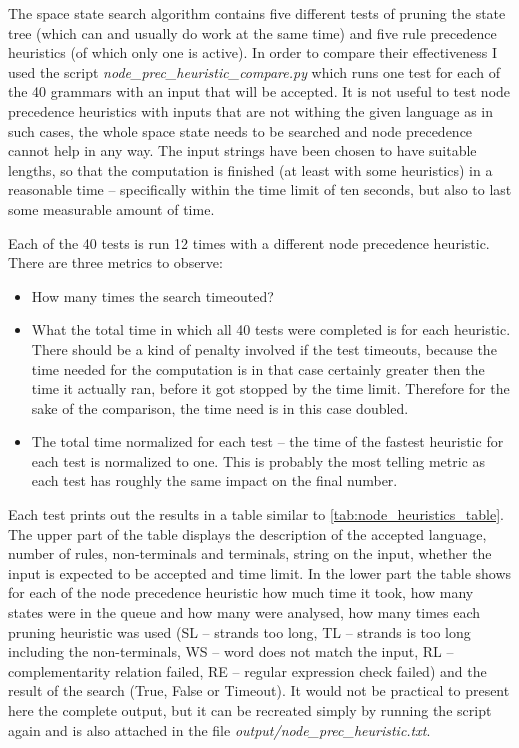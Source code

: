 The space state search algorithm contains five different tests of pruning the state tree (which can and usually do work at the same time) and five rule precedence heuristics (of which only one is active). In order to compare their effectiveness I used the script \textit{node\_prec\_heuristic\_compare.py} which runs one test for each of the 40 grammars with an input that will be accepted. It is not useful to test node precedence heuristics with inputs that are not withing the given language as in such cases, the whole space state needs to be searched and node precedence cannot help in any way. The input strings have been chosen to have suitable lengths, so that the computation is finished (at least with some heuristics) in a reasonable time -- specifically within the time limit of ten seconds, but also to last some measurable amount of time.

Each of the 40 tests is run 12 times with a different node precedence heuristic. There are three metrics to observe:
\begin{itemize}
  \item{How many times the search timeouted?}
  \item{What the total time in which all 40 tests were completed is for each heuristic. There should be a kind of penalty involved if the test timeouts, because the time needed for the computation is in that case certainly greater then the time it actually ran, before it got stopped by the time limit. Therefore for the sake of the comparison, the time need is in this case doubled.}
  \item{The total time normalized for each test -- the time of the fastest heuristic for each test is normalized to one. This is probably the most telling metric as each test has roughly the same impact on the final number.}
\end{itemize}

Each test prints out the results in a table similar to \ref{tab:node_heuristics_table}. The upper part of the table displays the description of the accepted language, number of rules, non-terminals and terminals, string on the input, whether the input is expected to be accepted and time limit. In the lower part the table shows for each of the node precedence heuristic how much time it took, how many states were in the queue and how many were analysed, how many times each pruning heuristic was used (SL -- strands too long, TL -- strands is too long including the non-terminals, WS -- word does not match the input, RL -- complementarity relation failed, RE -- regular expression check failed) and the result of the search (True, False or Timeout). It would not be practical to present here the complete output, but it can be recreated simply by running the script again and is also attached in the file \textit{output/node\_prec\_heuristic.txt}.

